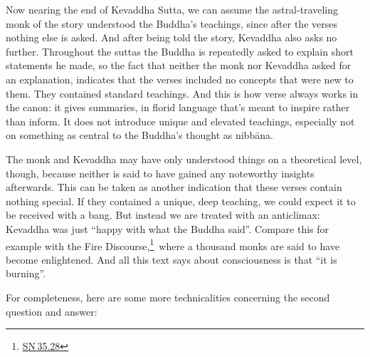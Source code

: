 \documentclass[10pt, openright]{book}
\begin{document}
Now nearing the end of Kevaddha Sutta, we can assume the astral-traveling monk of the story understood the Buddha’s teachings, since after the verses nothing else is asked. And after being told the story, Kevaddha also asks no further. Throughout the suttas the Buddha is repeatedly asked to explain short statements he made, so the fact that neither the monk nor Kevaddha asked for an explanation, indicates that the verses included no concepts that were new to them. They contained standard teachings. And this is how verse always works in the canon: it gives summaries, in florid language that’s meant to inspire rather than inform. It does not introduce unique and elevated teachings, especially not on something as central to the Buddha’s thought as nibbāna.


The monk and Kevaddha may have only understood things on a theoretical level, though, because neither is said to have gained any noteworthy insights afterwards. This can be taken as another indication that these verses contain nothing special. If they contained a unique, deep teaching, we could expect it to be received with a bang. But instead we are treated with an anticlimax: Kevaddha was just “happy with what the Buddha said”. Compare this for example with the Fire Discourse,\footnote {\href{https://suttacentral.net/sn35.28/en/sujato}{SN 35.28}} where a thousand monks are said to have become enlightened. And all this text says about consciousness is that “it is burning”.


For completeness, here are some more technicalities concerning the second question and answer:
\end{document}

